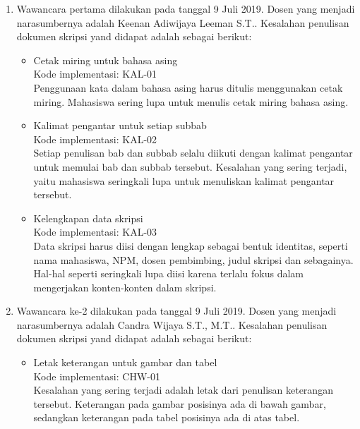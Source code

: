 \begin{enumerate}
	\item Wawancara pertama dilakukan pada tanggal 9 Juli 2019. Dosen yang menjadi narasumbernya adalah Keenan Adiwijaya Leeman S.T.. Kesalahan penulisan dokumen skripsi yand didapat adalah sebagai berikut:
		
		\begin{itemize}
			\item Cetak miring untuk bahasa asing \\
			Kode implementasi: KAL-01 \\
			Penggunaan kata dalam bahasa asing harus ditulis menggunakan cetak miring.	Mahasiswa sering lupa untuk menulis cetak miring bahasa asing.
			
			\item Kalimat pengantar untuk setiap subbab \\
			Kode implementasi: KAL-02 \\			
			Setiap penulisan bab dan subbab selalu diikuti dengan kalimat pengantar untuk memulai bab dan subbab tersebut. Kesalahan yang sering terjadi, yaitu mahasiswa seringkali lupa untuk menuliskan kalimat pengantar tersebut.
			
			\item Kelengkapan data skripsi \\
			Kode implementasi: KAL-03 \\
			Data skripsi harus diisi dengan lengkap sebagai bentuk identitas, seperti nama mahasiswa, NPM, dosen pembimbing, judul skripsi dan sebagainya. Hal-hal seperti seringkali lupa diisi karena terlalu fokus dalam mengerjakan konten-konten dalam skripsi.				
			
		\end{itemize}
		
	\item Wawancara ke-2 dilakukan pada tanggal 9 Juli 2019. Dosen yang menjadi narasumbernya adalah Candra Wijaya S.T., M.T.. Kesalahan penulisan dokumen skripsi yand didapat adalah sebagai berikut:
	
		\begin{itemize}
			\item Letak keterangan untuk gambar dan tabel \\
			Kode implementasi: CHW-01 \\
			Kesalahan yang sering terjadi adalah letak dari penulisan keterangan tersebut. Keterangan pada gambar posisinya ada di bawah gambar, sedangkan keterangan pada tabel posisinya ada di atas tabel.
			

\end{itemize}
\end{enumerate}
